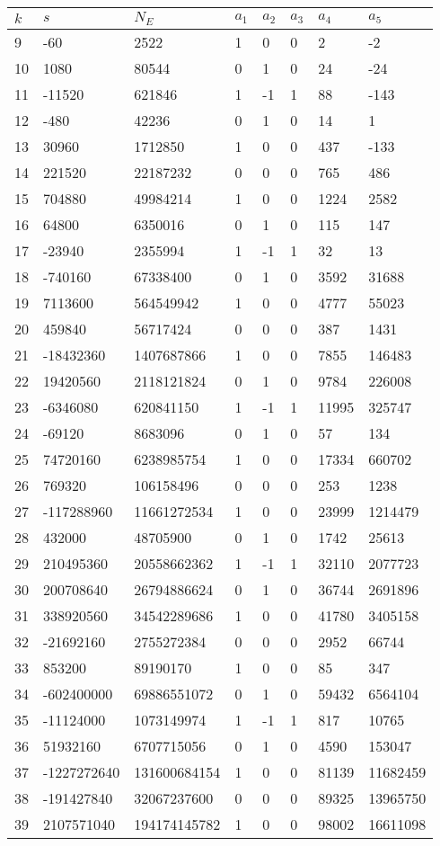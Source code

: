 \documentclass{amsart}
\begin{document}
\begin{longtable}{|l|l|l|lllll|}
\hline
$k$ & $s$ & $N_E$ & $a_1$ & $a_2$ & $a_3$ & $a_4$ & $a_5$\\
\hline
9&-60&2522&1&0&0&2&-2\\
10&1080&80544&0&1&0&24&-24\\
11&-11520&621846&1&-1&1&88&-143\\
12&-480&42236&0&1&0&14&1\\
13&30960&1712850&1&0&0&437&-133\\
14&221520&22187232&0&0&0&765&486\\
15&704880&49984214&1&0&0&1224&2582\\
16&64800&6350016&0&1&0&115&147\\
17&-23940&2355994&1&-1&1&32&13\\
18&-740160&67338400&0&1&0&3592&31688\\
19&7113600&564549942&1&0&0&4777&55023\\
20&459840&56717424&0&0&0&387&1431\\
21&-18432360&1407687866&1&0&0&7855&146483\\
22&19420560&2118121824&0&1&0&9784&226008\\
23&-6346080&620841150&1&-1&1&11995&325747\\
24&-69120&8683096&0&1&0&57&134\\
25&74720160&6238985754&1&0&0&17334&660702\\
26&769320&106158496&0&0&0&253&1238\\
27&-117288960&11661272534&1&0&0&23999&1214479\\
28&432000&48705900&0&1&0&1742&25613\\
29&210495360&20558662362&1&-1&1&32110&2077723\\
30&200708640&26794886624&0&1&0&36744&2691896\\
31&338920560&34542289686&1&0&0&41780&3405158\\
32&-21692160&2755272384&0&0&0&2952&66744\\
33&853200&89190170&1&0&0&85&347\\
34&-602400000&69886551072&0&1&0&59432&6564104\\
35&-11124000&1073149974&1&-1&1&817&10765\\
36&51932160&6707715056&0&1&0&4590&153047\\
37&-1227272640&131600684154&1&0&0&81139&11682459\\
38&-191427840&32067237600&0&0&0&89325&13965750\\
39&2107571040&194174145782&1&0&0&98002&16611098\\

\end{longtable}
\end{document}
